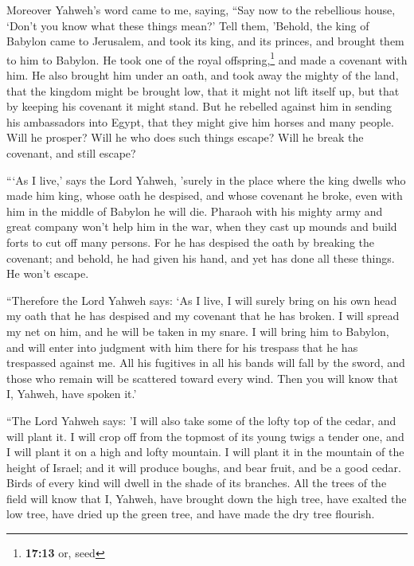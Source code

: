  Moreover Yahweh's word came to me, saying,
 ``Say now to the rebellious house, `Don't you know what
these things mean?' Tell them, 'Behold, the king of Babylon came to
Jerusalem, and took its king, and its princes, and brought them to him
to Babylon.  He took one of the royal
offspring,\footnote{\textbf{17:13} or, seed} and made a covenant with
him. He also brought him under an oath, and took away the mighty of the
land,  that the kingdom might be brought low, that it
might not lift itself up, but that by keeping his covenant it might
stand.  But he rebelled against him in sending his
ambassadors into Egypt, that they might give him horses and many people.
Will he prosper? Will he who does such things escape? Will he break the
covenant, and still escape?

 ```As I live,' says the Lord Yahweh, 'surely in the
place where the king dwells who made him king, whose oath he despised,
and whose covenant he broke, even with him in the middle of Babylon he
will die.  Pharaoh with his mighty army and great company
won't help him in the war, when they cast up mounds and build forts to
cut off many persons.  For he has despised the oath by
breaking the covenant; and behold, he had given his hand, and yet has
done all these things. He won't escape.

 ``Therefore the Lord Yahweh says: `As I live, I will
surely bring on his own head my oath that he has despised and my
covenant that he has broken.  I will spread my net on
him, and he will be taken in my snare. I will bring him to Babylon, and
will enter into judgment with him there for his trespass that he has
trespassed against me.  All his fugitives in all his
bands will fall by the sword, and those who remain will be scattered
toward every wind. Then you will know that I, Yahweh, have spoken it.'

 ``The Lord Yahweh says: 'I will also take some of the
lofty top of the cedar, and will plant it. I will crop off from the
topmost of its young twigs a tender one, and I will plant it on a high
and lofty mountain.  I will plant it in the mountain of
the height of Israel; and it will produce boughs, and bear fruit, and be
a good cedar. Birds of every kind will dwell in the shade of its
branches.  All the trees of the field will know that I,
Yahweh, have brought down the high tree, have exalted the low tree, have
dried up the green tree, and have made the dry tree flourish.

